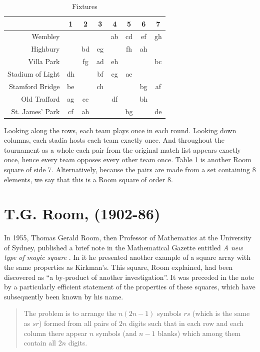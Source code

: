 \documentclass[
  11pt,
  a4paper]{book}
\begin{document}
\begin{table}[h!]
  \begin{center}
    \caption{Fixtures}
    \label{tab:fixtures}
    \begin{tabular}{r|ccccccc}
                       & 1  &  2 &  3 &  4 &  5 &  6 &  7 \\ \hline
               Wembley &    &    &    & ab & cd & ef & gh \\
              Highbury &    & bd & eg &    & fh & ah &    \\
            Villa Park &    & fg & ad & eh &    &    & bc \\
      Stadium of Light & dh &    & bf & cg & ae &    &    \\
       Stamford Bridge & be &    & ch &    &    & bg & af \\
          Old Trafford & ag & ce &    & df &    & bh &    \\
       St. James' Park & cf & ah &    &    & bg &    & de
    \end{tabular}
  \end{center}
\end{table}

Looking along the rows, each team plays once in each round. Looking down
columns, each stadia hosts each team exactly once. And throughout the
tournament as a whole each pair from the original match list appears
exactly once, hence every team opposes every other team once. Table
\ref{tab:fixtures}
is another Room square of side 7. Alternatively, because the pairs are
made from a set containing 8 elements, we say that this is a Room square
of order 8.

\hypertarget{t.g.-room-1902-86}{%
\section{T.G. Room, (1902-86)}\label{t.g.-room-1902-86}}

In 1955, Thomas Gerald Room, then Professor of Mathematics at the
University of Sydney, published a brief note in the Mathematical Gazette
entitled \emph{A new type of magic square}
\autocite{room_2569_1955}.
In it he presented another
example of a square array with the same properties as Kirkman's. This
square, Room explained, had been discovered as ``a by-product of
another investigation''. It was preceded in the note by a particularly
efficient statement of the properties of these squares, which have
subsequently been known by his name.

\begin{quote}
The problem is to arrange the \(n(2n-1)\) symbols \(rs\) (which is the
same as \(sr\)) formed from all pairs of \(2n\) digits such that in each
row and each column there appear \(n\) symbols (and \(n-1\) blanks) which
among them contain all \(2n\) digits.
\end{quote}
\end{document}
